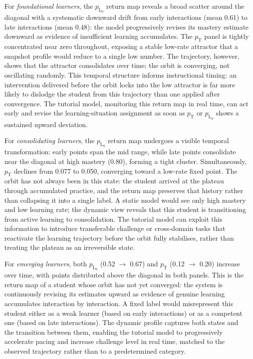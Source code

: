 \documentclass[runningheads]{llncs}
\begin{document}
For \textit{foundational learners}, the $p_{\text{L}_0}$ return map reveals a broad scatter around the diagonal with a systematic downward drift from early interactions (mean 0.61) to late interactions (mean 0.48): the model progressively revises its mastery estimate downward as evidence of insufficient learning accumulates. The $p_{\text{T}}$ panel is tightly concentrated near zero throughout, exposing a stable low-rate attractor that a snapshot profile would reduce to a single low number. The trajectory, however, shows that the attractor consolidates over time; the orbit is converging, not oscillating randomly. This temporal structure informs instructional timing: an intervention delivered before the orbit locks into the low attractor is far more likely to dislodge the student from this trajectory than one applied after convergence. The tutorial model, monitoring this return map in real time, can act early and revise the learning-situation assignment as soon as $p_{\text{T}}$ or $p_{\text{L}_0}$ shows a sustained upward deviation.

For \textit{consolidating learners}, the $p_{\text{L}_0}$ return map undergoes a visible temporal transformation: early points span the mid range, while late points consolidate near the diagonal at high mastery (0.80), forming a tight cluster. Simultaneously, $p_{\text{T}}$ declines from 0.077 to 0.050, converging toward a low-rate fixed point. The orbit has not always been in this state: the student arrived at the plateau through accumulated practice, and the return map preserves that history rather than collapsing it into a single label. A static model would see only high mastery and low learning rate; the dynamic view reveals that this student is transitioning from active learning to consolidation. The tutorial model can exploit this information to introduce transferable challenge or cross-domain tasks that reactivate the learning trajectory before the orbit fully stabilises, rather than treating the plateau as an irreversible state.

For \textit{emerging learners}, both $p_{\text{L}_0}$ (0.52 $\to$ 0.67) and $p_{\text{T}}$ (0.12 $\to$ 0.20) increase over time, with points distributed above the diagonal in both panels. This is the return map of a student whose orbit has not yet converged: the system is continuously revising its estimates upward as evidence of genuine learning accumulates interaction by interaction. A fixed label would misrepresent this student either as a weak learner (based on early interactions) or as a competent one (based on late interactions). The dynamic profile captures both states and the transition between them, enabling the tutorial model to progressively accelerate pacing and increase challenge level in real time, matched to the observed trajectory rather than to a predetermined category.
\end{document}
